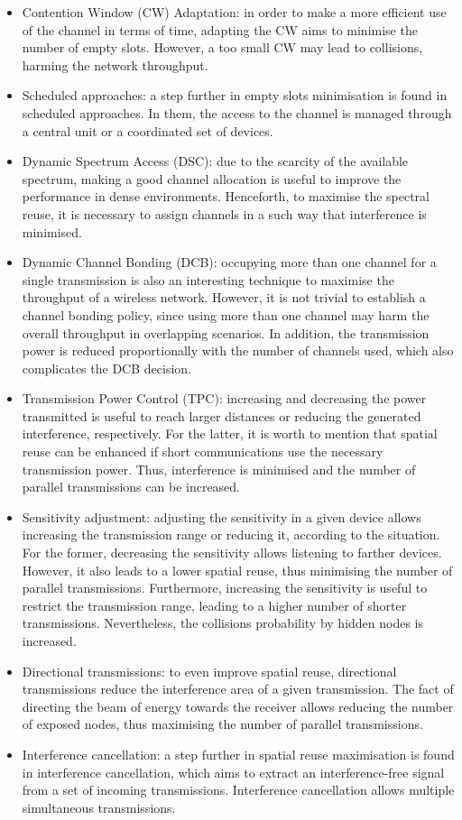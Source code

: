 \documentclass[12pt, a4paper,twoside]{tesi_upf}
\begin{document}
			\begin{itemize}
				\item Contention Window (CW) Adaptation: in order to make a more efficient use of the channel in terms of time, adapting the CW aims to minimise the number of empty slots. However, a too small CW may lead to collisions, harming the network throughput.
				\item Scheduled approaches: a step further in empty slots minimisation is found in scheduled approaches. In them, the access to the channel is managed through a central unit or a coordinated set of devices. 
				\item Dynamic Spectrum Access (DSC): due to the scarcity of the available spectrum, making a good channel allocation is useful to improve the performance in dense environments. Henceforth, to maximise the spectral reuse, it is necessary to assign channels in a such way that interference is minimised.
				\item Dynamic Channel Bonding (DCB): occupying more than one channel for a single transmission is also an interesting technique to maximise the throughput of a wireless network. However, it is not trivial to establish a channel bonding policy, since using more than one channel may harm the overall throughput in overlapping scenarios. In addition, the transmission power is reduced proportionally with the number of channels used, which also complicates the DCB decision.
				\item Transmission Power Control (TPC): increasing and decreasing the power transmitted is useful to reach larger distances or reducing the generated interference, respectively. For the latter, it is worth to mention that spatial reuse can be enhanced if short communications use the necessary transmission power. Thus, interference is minimised and the number of parallel transmissions can be increased.
				\item Sensitivity adjustment: adjusting the sensitivity in a given device allows increasing the transmission range or reducing it, according to the situation. For the former, decreasing the sensitivity allows listening to farther devices. However, it also leads to a lower spatial reuse, thus minimising the number of parallel transmissions. Furthermore, increasing the sensitivity is useful to restrict the transmission range, leading to a higher number of shorter transmissions. Nevertheless, the collisions probability by hidden nodes is increased.
				\item Directional transmissions: to even improve spatial reuse, directional transmissions reduce the interference area of a given transmission. The fact of directing the beam of energy towards the receiver allows reducing the number of exposed nodes, thus maximising the number of parallel transmissions.
				\item Interference cancellation: a step further in spatial reuse maximisation is found in interference cancellation, which aims to extract an interference-free signal from a set of incoming transmissions. Interference cancellation allows multiple simultaneous transmissions.
			\end{itemize}
\end{document}

